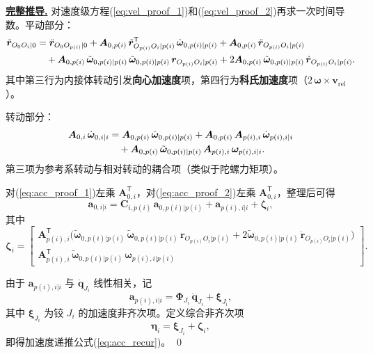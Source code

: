 \documentclass[10pt,a4paper]{book}
\theoremstyle{thmstyle}
\theoremstyle{defstyle}
\theoremstyle{prostyle}
\renewenvironment{proof}[1][证明]{\par{\kaishu \underline{\textbf{#1.}}} \;\fangsong}{\qed\par}
\newcommand{\T}{^{\mathsf{T}}}
\renewcommand{\vec}[1]{\bm{#1}}
\newcommand{\mat}[1]{\bm{#1}}
\newcommand{\tildev}[1]{\tilde{#1}}
\begin{document}
\begin{proof}[完整推导]
对速度级方程(\ref{eq:vel_proof_1})和(\ref{eq:vel_proof_2})再求一次时间导数。平动部分：
\begin{align}
\ddot{\vec{r}}_{O_0O_i|0}
&= \ddot{\vec{r}}_{O_0O_{p(i)}|0}
+ \mat{A}_{0,p(i)}\,\tildev{\vec{r}}_{O_{p(i)}O_i|p(i)}\T\,\dot{\vec{\omega}}_{0,p(i)|p(i)}
+ \mat{A}_{0,p(i)}\,\ddot{\vec{r}}_{O_{p(i)}O_i|p(i)} \notag\\
&\quad + \mat{A}_{0,p(i)}\,\tildev{\vec{\omega}}_{0,p(i)|p(i)}\,
\tildev{\vec{\omega}}_{0,p(i)|p(i)}\,\vec{r}_{O_{p(i)}O_i|p(i)}
+ 2\mat{A}_{0,p(i)}\,\tildev{\vec{\omega}}_{0,p(i)|p(i)}\,
\dot{\vec{r}}_{O_{p(i)}O_i|p(i)}.
\label{eq:acc_proof_1}
\end{align}
其中第三行为内接体转动引发\textbf{向心加速度}项，第四行为\textbf{科氏加速度}项（$2\,\vec{\omega}\times \vec{v}_{\text{rel}}$）。

转动部分：
\begin{align}
\mat{A}_{0,i}\,\dot{\vec{\omega}}_{0,i|i}
&= \mat{A}_{0,p(i)}\,\dot{\vec{\omega}}_{0,p(i)|p(i)}
+ \mat{A}_{0,p(i)}\,\mat{A}_{p(i),i}\,\dot{\vec{\omega}}_{p(i),i|i} \notag\\
&\quad + \mat{A}_{0,p(i)}\,\tildev{\vec{\omega}}_{0,p(i)|p(i)}\,
\mat{A}_{p(i),i}\,\vec{\omega}_{p(i),i|i}.
\label{eq:acc_proof_2}
\end{align}
第三项为参考系转动与相对转动的耦合项（类似于陀螺力矩项）。

对(\ref{eq:acc_proof_1})左乘 $\mat{A}_{0,i}\T$，对(\ref{eq:acc_proof_2})左乘 $\mat{A}_{0,i}\T$，整理后可得
\begin{equation}
\vec{a}_{0,i|i} = \mat{C}_{i,p(i)}\,\vec{a}_{0,p(i)|p(i)} + \vec{a}_{p(i),i|i} + \vec{\zeta}_i,
\label{eq:acc_mid}
\end{equation}
其中
\begin{equation}
\vec{\zeta}_i =
\begin{bmatrix}
\mat{A}_{p(i),i}\T\bigl(
\tildev{\vec{\omega}}_{0,p(i)|p(i)}\,\tildev{\vec{\omega}}_{0,p(i)|p(i)}\,\vec{r}_{O_{p(i)}O_i|p(i)}
+ 2\tildev{\vec{\omega}}_{0,p(i)|p(i)}\,\dot{\vec{r}}_{O_{p(i)}O_i|p(i)}
\bigr) \\[6pt]
\mat{A}_{p(i),i}\T\,\tildev{\vec{\omega}}_{0,p(i)|p(i)}\,\vec{\omega}_{p(i),i|p(i)}
\end{bmatrix}.
\label{eq:zeta_i}
\end{equation}

由于 $\vec{a}_{p(i),i|i}$ 与 $\ddot{\vec{q}}_{J_i}$ 线性相关，记
\[
\vec{a}_{p(i),i|i} = \mat{\Phi}_{J_i}\,\ddot{\vec{q}}_{J_i} + \vec{\xi}_{J_i},
\]
其中 $\vec{\xi}_{J_i}$ 为铰 $J_i$ 的加速度非齐次项。定义综合非齐次项
\[
\vec{\eta}_i = \vec{\xi}_{J_i} + \vec{\zeta}_i,
\]
即得加速度递推公式(\ref{eq:acc_recur})。
\end{proof}
\end{document}
